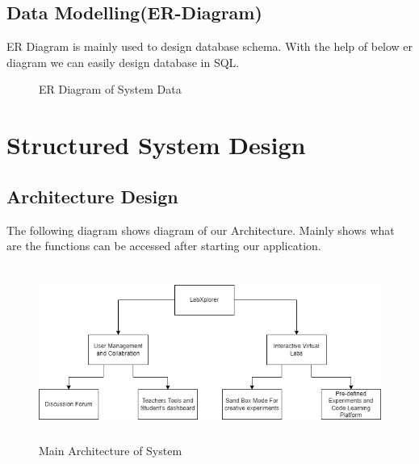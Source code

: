 \subsection{Data Modelling(ER-Diagram)}
ER Diagram is mainly used to design database schema. With the help of below er diagram we can easily design database in SQL.
\begin{figure}[H]
    \centering
    \caption{ER Diagram of System Data}
\end{figure}
\newpage
\section{Structured System Design}
\subsection{Architecture Design}
The following diagram shows diagram of our Architecture. Mainly shows what are the functions can be accessed after starting our application.
\begin{figure}[H]
    \includegraphics[height = 5.7cm]{Diagrams/Main_Block.png}
    \caption{Main Architecture of System}
\end{figure}
\newpage
